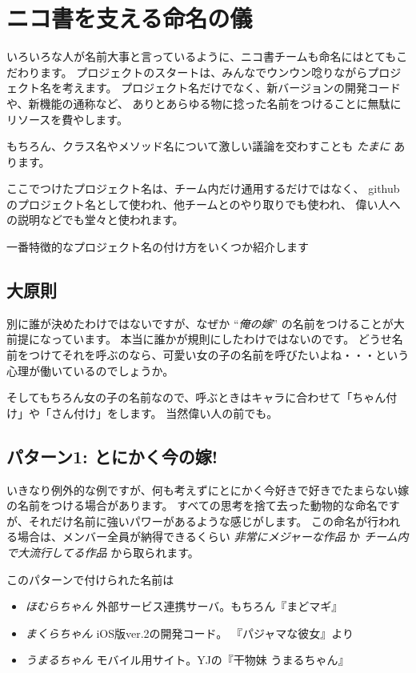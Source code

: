 \section{ニコ書を支える命名の儀}

いろいろな人が名前大事と言っているように、ニコ書チームも命名にはとてもこだわります。
プロジェクトのスタートは、みんなでウンウン唸りながらプロジェクト名を考えます。
プロジェクト名だけでなく、新バージョンの開発コードや、新機能の通称など、
ありとあらゆる物に捻った名前をつけることに無駄にリソースを費やします。

もちろん、クラス名やメソッド名について激しい議論を交わすことも
\emph{たまに} あります。

ここでつけたプロジェクト名は、チーム内だけ通用するだけではなく、
githubのプロジェクト名として使われ、他チームとのやり取りでも使われ、
偉い人への説明などでも堂々と使われます。

一番特徴的なプロジェクト名の付け方をいくつか紹介します

\subsection{大原則}

別に誰が決めたわけではないですが、なぜか ``\emph{俺の嫁}''
の名前をつけることが大前提になっています。
本当に誰かが規則にしたわけではないのです。
どうせ名前をつけてそれを呼ぶのなら、可愛い女の子の名前を呼びたいよね・・・という心理が働いているのでしょうか。

そしてもちろん女の子の名前なので、呼ぶときはキャラに合わせて「ちゃん付け」や「さん付け」をします。
当然偉い人の前でも。

\subsection{パターン1: とにかく今の嫁!}

いきなり例外的な例ですが、何も考えずにとにかく今好きで好きでたまらない嫁の名前をつける場合があります。
すべての思考を捨て去った動物的な命名ですが、それだけ名前に強いパワーがあるような感じがします。
この命名が行われる場合は、メンバー全員が納得できるくらい
\emph{非常にメジャーな作品} か \emph{チーム内で大流行してる作品}
から取られます。

このパターンで付けられた名前は

\begin{itemize}
\itemsep1pt\parskip0pt
\item
  \emph{ほむらちゃん} 外部サービス連携サーバ。もちろん『まどマギ』
\item
  \emph{まくらちゃん} iOS版ver.2の開発コード。 『パジャマな彼女』より
\item
  \emph{うまるちゃん} モバイル用サイト。YJの『干物妹 うまるちゃん』
\end{itemize}

